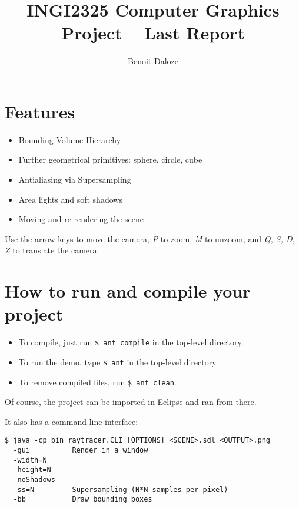 \documentclass[a4paper,11pt]{article}
\title{INGI2325 Computer Graphics \\
  Project -- Last Report}
\author{Benoit Daloze}
\begin{document}
\maketitle

\section{Features}

\begin{itemize}
  \item Bounding Volume Hierarchy
  \item Further geometrical primitives: sphere, circle, cube
  \item Antialiasing via Supersampling
  \item Area lights and soft shadows
  \item Moving and re-rendering the scene
\end{itemize}

Use the arrow keys to move the camera, \emph{P} to zoom, \emph{M} to unzoom, and \emph{Q, S, D, Z} to translate the camera.

\section{How to run and compile your project}

\begin{itemize}
  \item To compile, just run \texttt{\$ ant compile} in the top-level directory.
  \item To run the demo, type \texttt{\$ ant} in the top-level directory.
  \item To remove compiled files, run \texttt{\$ ant clean}.
\end{itemize}

Of course, the project can be imported in Eclipse and ran from there.

It also has a command-line interface:
\begin{verbatim}
$ java -cp bin raytracer.CLI [OPTIONS] <SCENE>.sdl <OUTPUT>.png
  -gui          Render in a window
  -width=N
  -height=N
  -noShadows
  -ss=N         Supersampling (N*N samples per pixel)
  -bb           Draw bounding boxes
\end{verbatim}
\end{document}
